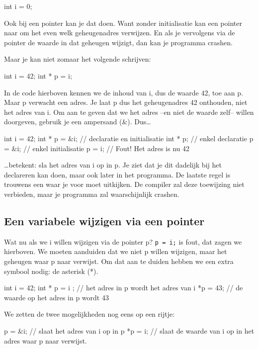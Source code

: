 \begin{code}
int i = 0;
\end{code}

Ook bij een pointer kan je dat doen. Want zonder initialisatie kan een pointer naar om het even welk geheugenadres verwijzen. En als je vervolgens via de pointer de waarde in dat geheugen wijzigt, dan kan je programma crashen.

Maar je kan niet zomaar het volgende schrijven:
\begin{code}
int i = 42;
int * p = i;
\end{code}

In de code hierboven kennen we de inhoud van i, dus de waarde 42, toe aan p. Maar p verwacht een adres. Je laat p dus het geheugenadres 42 onthouden, niet het adres van i. Om aan te geven dat we het adres --en niet de waarde zelf-- willen doorgeven, gebruik je een ampersand (\&). Dus\ldots

\begin{code}
int   i = 42;
int * p = &i; // declaratie en initialisatie
int * p;      // enkel declaratie
p       = &i; // enkel initialisatie
p       =  i; // Fout! Het adres is nu 42 
\end{code}    

\ldots betekent: sla het adres van i op in p. Je ziet dat je dit dadelijk bij het declareren kan doen, maar ook later in het programma. De laatste regel is trouwens een waar je voor moet uitkijken. De compiler zal deze toewijzing niet verbieden, maar je programma zal waarschijnlijk crashen.

\subsection{Een variabele wijzigen via een pointer}
Wat nu als we i willen wijzigen via de pointer p? \texttt{p = i;} is fout, dat zagen we hierboven. We moeten aanduiden dat we niet p willen wijzigen, maar het geheugen waar p naar verwijst. Om dat aan te duiden hebben we een extra symbool nodig: de asterisk (*).

\begin{code}
int   i = 42;
int * p = i ; // het adres in p wordt het adres van i
*p      = 43; // de waarde op het adres in p wordt 43
\end{code}

We zetten de twee mogelijkheden nog eens op een rijtje:

\begin{code}
p = &i; // slaat het adres van i op in p
*p = i; // slaat de waarde van i op in het adres waar p naar verwijst.
\end{code}

